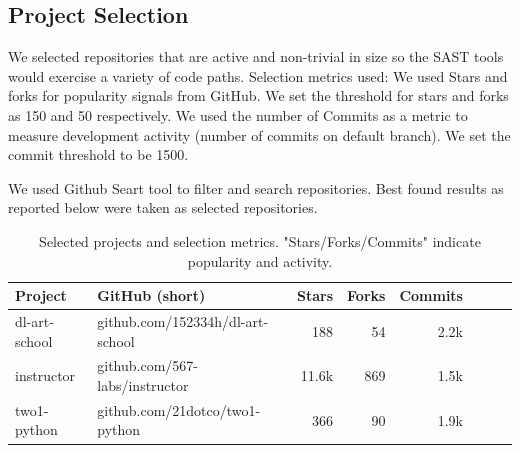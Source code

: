 \subsection{Project Selection}
We selected repositories that are active and non-trivial in size so the SAST tools would exercise a variety of code paths. Selection metrics used:
We used Stars and forks for popularity signals from GitHub. We set the threshold for stars and forks as 150 and 50 respectively. We used the number of Commits as a metric to measure development activity (number of commits on default branch). We set the commit threshold to be 1500.

We used Github Seart tool to filter and search repositories. Best found results as reported below were taken as selected repositories.
\begin{table}[H]
\centering
\begin{tabular}{l l r r r r r l}
Project & GitHub (short) & Stars & Forks & Commits \\
\midrule
dl-art-school & github.com/152334h/dl-art-school & 188 & 54 & 2.2k \\
instructor & github.com/567-labs/instructor & 11.6k & 869 & 1.5k \\
two1-python & github.com/21dotco/two1-python & 366 & 90 & 1.9k \\
\bottomrule
\end{tabular}
\caption{Selected projects and selection metrics. "Stars/Forks/Commits" indicate popularity and activity.}
\label{tab:projects}
\end{table}


